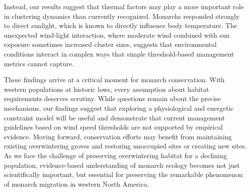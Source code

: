 \documentclass[insects,article,submit,pdftex,moreauthors]{Definitions/mdpi}
\begin{document}
Instead, our results suggest that thermal factors may play a more important role in clustering dynamics than currently recognized. Monarchs responded strongly to direct sunlight, which is known to directly influence body temperature. The unexpected wind-light interaction, where moderate wind combined with sun exposure sometimes increased cluster sizes, suggests that environmental conditions interact in complex ways that simple threshold-based management metrics cannot capture.

These findings arrive at a critical moment for monarch conservation. With western populations at historic lows, every assumption about habitat requirements deserves scrutiny. While questions remain about the precise mechanisms, our findings suggest that exploring a physiological and energetic constraint model will be useful and demonstrate that current management guidelines based on wind speed thresholds are not supported by empirical evidence. Moving forward, conservation efforts may benefit from maintaining existing overwintering groves and restoring unoccupied sites or creating new sites. As we face the challenge of preserving overwintering habitat for a declining population, evidence-based understanding of monarch ecology becomes not just scientifically important, but essential for preserving the remarkable phenomenon of monarch migration in western North America.



\vspace{6pt}


\end{document}
